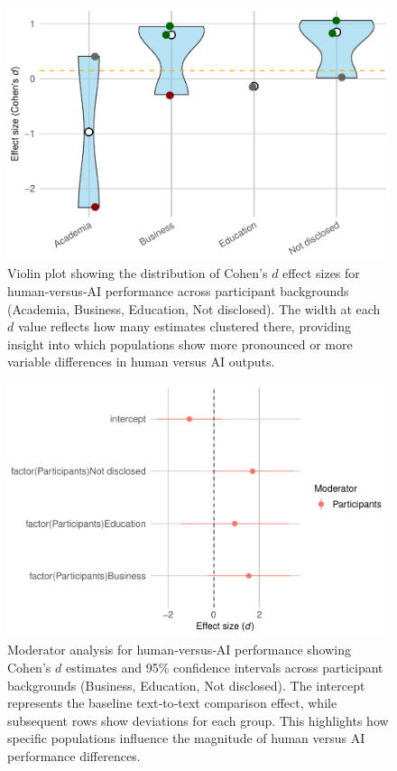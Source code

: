 \documentclass[acmsmall,authorversion]{acmart}
\begin{document}
\begin{figure}[H]
  \centering
  \includegraphics[width=\linewidth]{plot_versus_violin_participants}
  \caption{Violin plot showing the distribution of Cohen’s $d$ effect sizes for human‐versus‐AI performance across participant backgrounds (Academia, Business, Education, Not disclosed). The width at each $d$ value reflects how many estimates clustered there, providing insight into which populations show more pronounced or more variable differences in human versus AI outputs.}
  \label{fig:versus_violin_participants}
\end{figure}

\begin{figure}[H]
  \centering
  \includegraphics[width=\linewidth]{plot_versus_mod_plot}
  \caption{Moderator analysis for human‐versus‐AI performance showing Cohen’s $d$ estimates and 95\% confidence intervals across participant backgrounds (Business, Education, Not disclosed). The intercept represents the baseline text‐to‐text comparison effect, while subsequent rows show deviations for each group. This highlights how specific populations influence the magnitude of human versus AI performance differences.}
  \label{fig:versus_mod}
\end{figure}
\newpage
\end{document}
